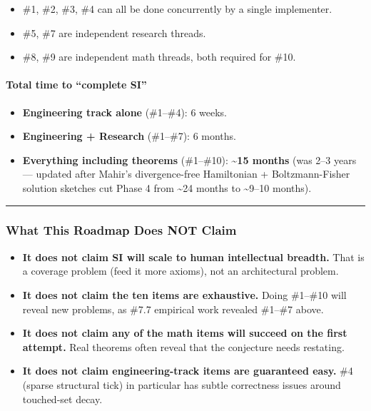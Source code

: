 \documentclass[
  11pt,
  a4paper,
]{article}
\providecommand{\tightlist}{%
  \setlength{\itemsep}{0pt}\setlength{\parskip}{0pt}}
\begin{document}
\begin{itemize}
\tightlist
\item
  \#1, \#2, \#3, \#4 can all be done concurrently by a single
  implementer.
\item
  \#5, \#7 are independent research threads.
\item
  \#8, \#9 are independent math threads, both required for \#10.
\end{itemize}

\paragraph{Total time to ``complete
SI''}\label{total-time-to-complete-si}

\begin{itemize}
\tightlist
\item
  \textbf{Engineering track alone} (\#1--\#4): 6 weeks.
\item
  \textbf{Engineering + Research} (\#1--\#7): 6 months.
\item
  \textbf{Everything including theorems} (\#1--\#10):
  \textbf{\textasciitilde15 months} (was 2--3 years --- updated after
  Mahir's divergence-free Hamiltonian + Boltzmann-Fisher solution
  sketches cut Phase 4 from \textasciitilde24 months to
  \textasciitilde9--10 months).
\end{itemize}

\begin{center}\rule{0.5\linewidth}{0.5pt}\end{center}

\subsubsection{What This Roadmap Does NOT
Claim}\label{what-this-roadmap-does-not-claim}

\begin{itemize}
\tightlist
\item
  \textbf{It does not claim SI will scale to human intellectual
  breadth.} That is a coverage problem (feed it more axioms), not an
  architectural problem.
\item
  \textbf{It does not claim the ten items are exhaustive.} Doing
  \#1--\#10 will reveal new problems, as \#7.7 empirical work revealed
  \#1--\#7 above.
\item
  \textbf{It does not claim any of the math items will succeed on the
  first attempt.} Real theorems often reveal that the conjecture needs
  restating.
\item
  \textbf{It does not claim engineering-track items are guaranteed
  easy.} \#4 (sparse structural tick) in particular has subtle
  correctness issues around touched-set decay.
\end{itemize}
\end{document}
